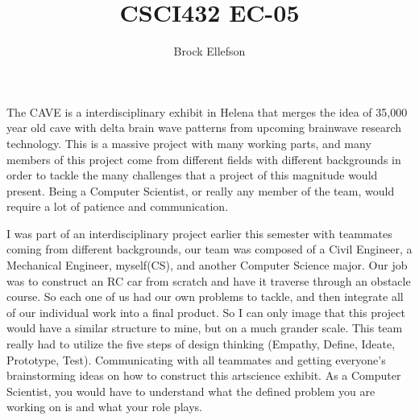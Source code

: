 \documentclass[10pt,a4paper]{article}
\author{Brock Ellefson}
\title{CSCI432 EC-05}
\begin{document}
\maketitle
\doublespacing

The CAVE is a interdisciplinary exhibit in Helena that merges the idea of 35,000 year old cave with delta brain wave patterns from upcoming brainwave research technology. This is a massive project with many working parts, and many members of this project come from different fields with different backgrounds in order to tackle the many challenges that a project of this magnitude would present. Being a Computer Scientist, or really any member of the team, would require a lot of patience and communication.

I was part of an interdisciplinary project earlier this semester with teammates coming from different backgrounds, our team was composed of a Civil Engineer, a Mechanical Engineer, myself(CS), and another Computer Science major. Our job was to construct an RC car from scratch and have it traverse through an obstacle course. So each one of us had our own problems to tackle, and then integrate all of our individual work into a final product. So I can only image that this project would have a similar structure to mine, but on a much grander scale. This team really had to utilize the five steps of design thinking (Empathy, Define, Ideate, Prototype, Test). Communicating with all teammates and getting everyone's brainstorming ideas on how to construct this artscience exhibit. As a Computer Scientist, you would have to understand what the defined problem you are working on is and what your role plays. 
\end{document}
